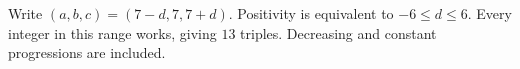Write $(a,b,c)=(7-d,7,7+d)$. Positivity is equivalent to $-6\le d\le6$. Every integer in this range works, giving $\boxed{13}$ triples. Decreasing and constant progressions are included.
